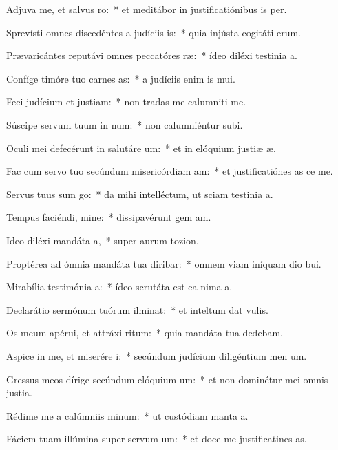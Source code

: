 \item Adjuva me, et salvus ro:~* et meditábor in justificatiónibus is per.
\item Sprevísti omnes discedéntes a judíciis is:~* quia injústa cogitáti erum.
\item Prævaricántes reputávi omnes peccatóres ræ:~* ídeo diléxi testinia a.
\item Confíge timóre tuo carnes as:~* a judíciis enim is mui.
\item Feci judícium et justiam:~* non tradas me calumniti me.
\item Súscipe servum tuum in num:~* non calumniéntur  subi.
\item Oculi mei defecérunt in salutáre um:~* et in elóquium justiæ æ.
\item Fac cum servo tuo secúndum misericórdiam am:~* et justificatiónes as ce me.
\item Servus tuus sum go:~* da mihi intelléctum, ut sciam testinia a.
\item Tempus faciéndi, mine:~* dissipavérunt gem am.
\item Ideo diléxi mandáta a,~* super aurum  tozion.
\item Proptérea ad ómnia mandáta tua diribar:~* omnem viam iníquam dio bui.
\item Mirabília testimónia a:~* ídeo scrutáta est ea nima a.
\item Declarátio sermónum tuórum ilminat:~* et inteltum dat vulis.
\item Os meum apérui, et attráxi ritum:~* quia mandáta tua dedebam.
\item Aspice in me, et miserére i:~* secúndum judícium diligéntium men um.
\item Gressus meos dírige secúndum elóquium um:~* et non dominétur mei omnis justia.
\item Rédime me a calúmniis minum:~* ut custódiam manta a.
\item Fáciem tuam illúmina super servum um:~* et doce me justificatines as.
